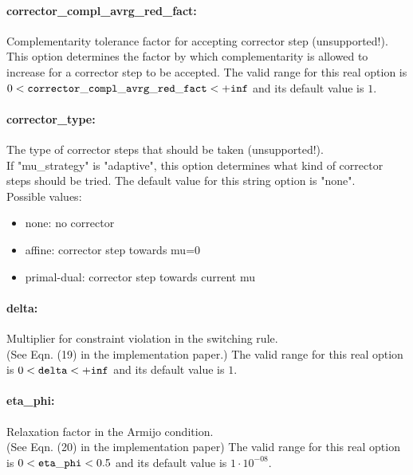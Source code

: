 \paragraph{corrector\_compl\_avrg\_red\_fact:}\label{sec:corrector_compl_avrg_red_fact} Complementarity tolerance factor for accepting corrector step (unsupported!). $\;$ \\
 This option determines the factor by which
complementarity is allowed to increase for a
corrector step to be accepted. The valid range for this real option is 
$0 <  {\tt corrector\_compl\_avrg\_red\_fact } <  {\tt +inf}$
and its default value is $1$.


\paragraph{corrector\_type:}\label{sec:corrector_type} The type of corrector steps that should be taken (unsupported!). $\;$ \\
 If "mu\_strategy" is "adaptive", this option
determines what kind of corrector steps should be
tried.
The default value for this string option is "none".
\\ 
Possible values:
\begin{itemize}
   \item none: no corrector
   \item affine: corrector step towards mu=0
   \item primal-dual: corrector step towards current mu
\end{itemize}

\paragraph{delta:}\label{sec:delta} Multiplier for constraint violation in the switching rule. $\;$ \\
 (See Eqn. (19) in the implementation paper.) The valid range for this real option is 
$0 <  {\tt delta } <  {\tt +inf}$
and its default value is $1$.


\paragraph{eta\_phi:}\label{sec:eta_phi} Relaxation factor in the Armijo condition. $\;$ \\
 (See Eqn. (20) in the implementation paper) The valid range for this real option is 
$0 <  {\tt eta\_phi } <  0.5$
and its default value is $1 \cdot 10^{-08}$.


